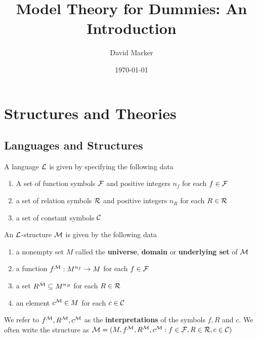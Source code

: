 \documentclass[11pt]{article}
\author{David Marker}
\date{\today}
\title{Model Theory for Dummies: An Introduction}
\begin{document}
\maketitle
\tableofcontents



\section{Structures and Theories}
\label{sec:org43ce45d}
\subsection{Languages and Structures}
\label{sec:org116377a}
\begin{definition}[]
A language \(\mathcal{L}\) is given by specifying the following data
\begin{enumerate}
\item A set of function symbols \(\mathcal{F}\) and positive integers \(n_f\) for each
\(f\in\mathcal{F}\)
\item a set of relation symbols \(\mathcal{R}\) and positive integers \(n_R\) for each
\(R\in\mathcal{R}\)
\item a set of constant symbols \(\mathcal{C}\)
\end{enumerate}
\end{definition}

\begin{definition}[]
An \(\mathcal{L}\)-structure \(\mathcal{M}\) is given by the following data
\begin{enumerate}
\item a nonempty set \(M\) called the \textbf{universe}, \textbf{domain} or \textbf{underlying set}
of \(\mathcal{M}\)
\item a function \(f^{\mathcal{M}}:M^{n_f}\to M\) for each \(f\in\mathcal{F}\)
\item a set \(R^{\mathcal{M}}\subseteq M^{n_R}\) for each \(R\in\mathcal{R}\)
\item an element \(c^{\mathcal{M}}\in M\) for each \(c\in\mathcal{C}\)
\end{enumerate}
\end{definition}

We refer to \(f^{\mathcal{M}},R^{\mathcal{M}},c^{\mathcal{M}}\) as the \textbf{interpretations} of the
symbols \(f,R\) and \(c\). We often write the structure as
\(\mathcal{M}=(M,f^{\mathcal{M}},R^{\mathcal{M}},c^{\mathcal{M}}:f\in\mathcal{F},R\in\mathcal{R},c\in\mathcal{C})\)
\end{document}
